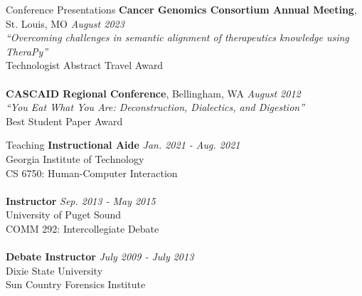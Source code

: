 \documentclass{cv} %
\begin{document}
\begin{rSection}{Conference Presentations}
{\bf Cancer Genomics Consortium Annual Meeting}{, St. Louis, MO} \hfill {\em August 2023}\\
{\em ``Overcoming challenges in semantic alignment of therapeutics knowledge using TheraPy''}\\
{Technologist Abstract Travel Award}\\
\\
{\bf CASCAID Regional Conference}{, Bellingham, WA} \hfill {\em August 2012}\\
{\em ``You Eat What You Are: Deconstruction, Dialectics, and Digestion''}\\
{Best Student Paper Award}

\end{rSection}


\begin{rSection}{Teaching}
{\bf Instructional Aide} \hfill {\em Jan. 2021 - Aug. 2021}\\
Georgia Institute of Technology\\
CS 6750: Human-Computer Interaction\\
\\
{\bf Instructor} \hfill {\em Sep. 2013 - May 2015}\\
University of Puget Sound\\
COMM 292: Intercollegiate Debate\\
\\
{\bf Debate Instructor} \hfill {\em July 2009 - July 2013}\\
Dixie State University\\
Sun Country Forensics Institute\\
\end{rSection}
\end{document}
